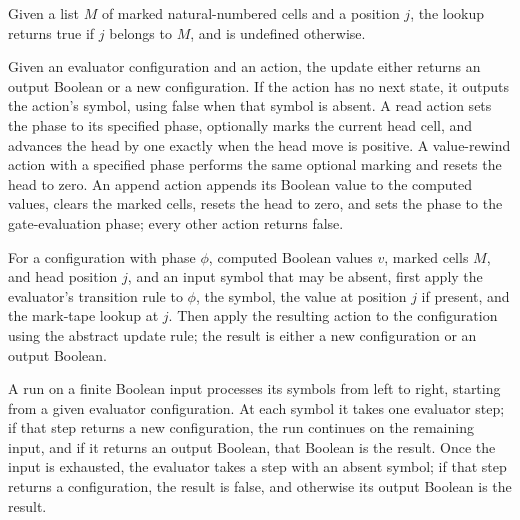 \begin{definition}
\label{BoolCircuit.CircuitEval.markCell}
\leanok
Given a list $M$ of marked natural-numbered cells and a position $j$, the lookup returns
true if $j$ belongs to $M$, and is undefined otherwise.
\end{definition}

\begin{definition}
\label{BoolCircuit.CircuitEval.absOf}
\leanok
{}
Given an evaluator configuration and an action, the update either returns an output
Boolean or a new configuration. If the action has no next state, it outputs the action's
symbol, using false when that symbol is absent. A read action sets the phase to its
specified phase, optionally marks the current head cell, and advances the head by one
exactly when the head move is positive. A value-rewind action with a specified phase
performs the same optional marking and resets the head to zero. An append action appends
its Boolean value to the computed values, clears the marked cells, resets the head to
zero, and sets the phase to the gate-evaluation phase; every other action returns false.
\end{definition}

\begin{definition}
\label{BoolCircuit.CircuitEval.absStep}
\leanok
{}
For a configuration with phase $\phi$, computed Boolean values $v$, marked cells $M$,
and head position $j$, and an input symbol that may be absent, first apply the
evaluator's transition rule to $\phi$, the symbol, the value at position $j$ if present,
and the mark-tape lookup at $j$. Then apply the resulting action to the configuration
using the abstract update rule; the result is either a new configuration or an output
Boolean.
\end{definition}

\begin{definition}
\label{BoolCircuit.CircuitEval.absRun}
\leanok
{}
A run on a finite Boolean input processes its symbols from left to right, starting from
a given evaluator configuration. At each symbol it takes one evaluator step; if that
step returns a new configuration, the run continues on the remaining input, and if it
returns an output Boolean, that Boolean is the result. Once the input is exhausted, the
evaluator takes a step with an absent symbol; if that step returns a configuration, the
result is false, and otherwise its output Boolean is the result.
\end{definition}

